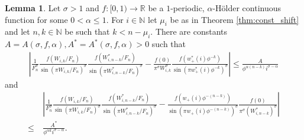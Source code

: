 \documentclass[]{interact}
\newcommand{\bbN}{\mathbb{N}}
\newcommand{\bbR}{\mathbb{R}}
\theoremstyle{definition}
\newtheorem{lem}[thm]{Lemma}
\numberwithin{table}{section} %
\numberwithin{figure}{section}
\begin{document}
\begin{lem} \label{lem:approx_quality}
    Let $\sigma > 1$ and $f:[0, 1) \rightarrow \bbR$ be a $1$-periodic, $\alpha$-Hölder continuous function for some $0 < \alpha \leq 1$. For $i \in \bbN$ let $\mu_i$ be as in Theorem \ref{thm:const_shift} and let $n, k \in \bbN$ be such that $k < n - \mu_i$. There are constants $A = A(\sigma, f, \alpha), A^*=A^*(\sigma, f, \alpha) > 0$ such that
    \begin{align*}
        \left|\frac1{F_n^\sigma} \frac{f(W_{i, k}/F_n)}{{\sin(\pi W_{i, k}/F_n)}^\sigma} \frac{f(W^*_{i, n-k}/F_n)}{{\sin(\pi W^*_{i, n-k}/F_n)}^\sigma} - \frac{f(0) }{\pi^\sigma W_{i, k}^\sigma} \frac{f(w_+^*(i) \phi^{-k})}{{\sin(\pi w_+^*(i) \phi^{-k})}^\sigma}\right| \leq \frac{A}{\phi^{\alpha (n-k)} i^{\sigma - \alpha}}
    \end{align*}
    and
    \begin{align*}
        & \left|\frac1{F_n^\sigma} \frac{f(W_{i, k}/F_n)}{{\sin(\pi W_{i, k}/F_n)}^\sigma} \frac{f(W^*_{i, n-k}/F_n)}{{\sin(\pi W^*_{i, n-k}/F_n)}^\sigma}
        - \frac{f(w_+(i) \phi^{-(n-k)})}{{\sin(\pi w_+(i) \phi^{-(n-k)})}^\sigma} \frac{f(0)}{ \pi^\sigma (W_{i, n-k}^*)^\sigma}\right| \\
        \leq ~ & \frac{A^*}{\phi^{\alpha k} i^{\sigma-\alpha}}.
    \end{align*}
\end{lem}
\end{document}
